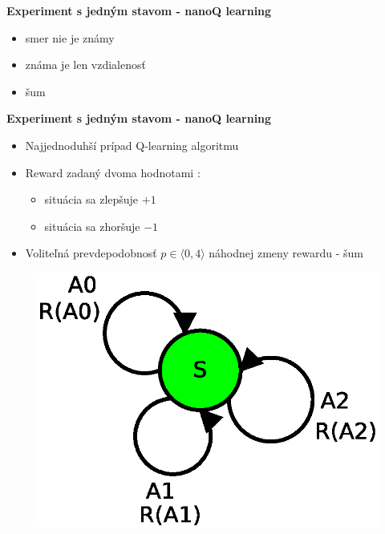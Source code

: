 \documentclass[xcolor=dvipsnames]{beamer}
\begin{document}
\begin{frame}{\bf Experiment s jedným stavom - nanoQ learning}
\begin{minipage}{.5\textwidth}
  \end{minipage}

  \begin{itemize}
  \item smer nie je známy
  \item známa je len vzdialenosť
  \item šum
  \end{itemize}

\end{frame}



\begin{frame}{\bf Experiment s jedným stavom - nanoQ learning}


  \begin{minipage}{.5\textwidth}

    \begin{itemize}
      \item Najjednoduhší prípad Q-learning algoritmu
      \item Reward zadaný dvoma hodnotami :
              \begin{itemize}
                \item situácia sa zlepšuje $+1$
                \item situácia sa zhoršuje $-1$
              \end{itemize}
      \item Voliteľná prevdepodobnosť $p \in \langle 0, 4 \rangle$ náhodnej zmeny rewardu - šum
    \end{itemize}


  \end{minipage}%
  \begin{minipage}{.5\textwidth}

    \begin{figure}[!htb]
    \centering
    \includegraphics[scale=.5]{../diagrams/single_state.eps}
    \end{figure}


\end{minipage}
\end{frame}
\end{document}
